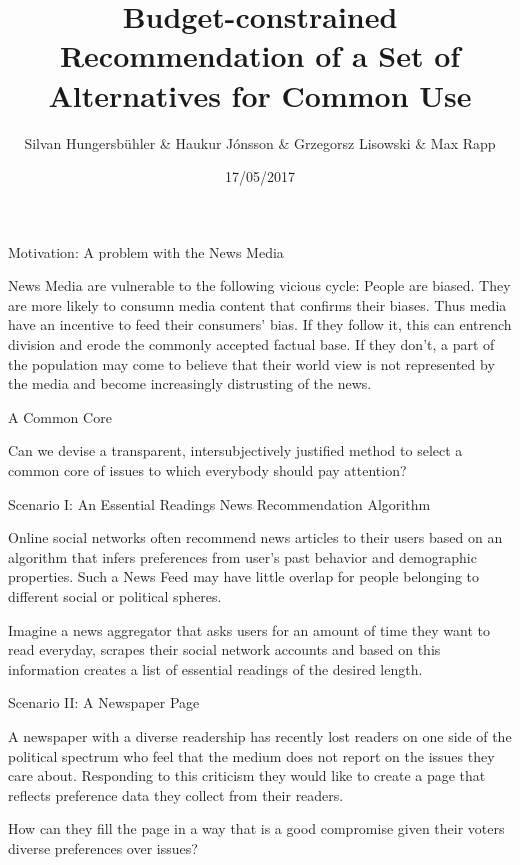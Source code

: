 \documentclass{beamer}
\title{Budget-constrained Recommendation of a Set of Alternatives for Common Use}
\author{Silvan Hungersb\"{u}hler \& Haukur J\'{o}nsson \& Grzegorsz Lisowski \& Max Rapp}
\date{17/05/2017}
\begin{document}
\begin{frame}
	\titlepage
\end{frame}

\begin{frame}{Motivation: A problem with the News Media}
	
	News Media are vulnerable to the following vicious cycle: People are biased. They are more likely to consumn media content that confirms their biases. Thus media have an incentive to feed their consumers' bias. If they follow it, this can entrench division and erode the commonly accepted factual base. If they don't, a part of the population may come to believe that their world view is not represented by the media and become increasingly distrusting of the news.
	
	
	
\end{frame}

\begin{frame}{A Common Core}
	
	Can we devise a transparent,  intersubjectively justified method to select a common core of issues to which everybody should pay attention?
	
	
\end{frame}
\begin{frame}{Scenario I: An Essential Readings News Recommendation Algorithm}
	
	Online social networks often recommend news articles to their users based on an algorithm that infers preferences from user's past behavior and demographic properties. Such a News Feed may have little overlap for people belonging to different social or political spheres.
	
	
	Imagine a news aggregator that asks users for an amount of time they want to read everyday, scrapes their social network accounts and based on this information creates a list of essential readings of the desired length.
	
	
	
	
	
	
\end{frame}

\begin{frame}{Scenario II: A  Newspaper Page}
	
	A newspaper with a diverse readership has recently lost readers on one side of the political spectrum who feel that the medium does not report on the issues they care about. Responding to this criticism they would like to create a page that reflects preference data they collect from their readers.
	
	How can they fill the page in a way that is a good compromise given their voters diverse preferences over issues?
	
\end{frame}
\end{document}

